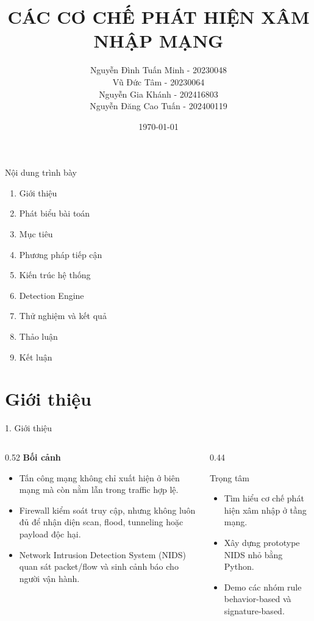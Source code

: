 \documentclass[t, aspectratio=169]{beamer}
\title{CÁC CƠ CHẾ PHÁT HIỆN XÂM NHẬP MẠNG}
\institute{Giảng viên hướng dẫn: PGS. TS. Nguyễn Linh Giang}
\author{\texorpdfstring{Nguyễn Đình Tuấn Minh - 20230048\\Vũ Đức Tâm - 20230064\\Nguyễn Gia Khánh - 202416803\\Nguyễn Đăng Cao Tuấn - 202400119}{Nhóm sinh viên}}
\date{\today}
\begin{document}
\husttitlepage

\begin{frame}{Nội dung trình bày}
    \begin{enumerate}
        \item Giới thiệu
        \item Phát biểu bài toán
        \item Mục tiêu
        \item Phương pháp tiếp cận
        \item Kiến trúc hệ thống
        \item Detection Engine
        \item Thử nghiệm và kết quả
        \item Thảo luận
        \item Kết luận
    \end{enumerate}
\end{frame}

\resetPageCount
\showPageNumber
\useStyleHustFull
\useThinBar

\section{Giới thiệu}

\begin{frame}{1. Giới thiệu}
    \begin{columns}[T,onlytextwidth]
        \begin{column}{0.52\textwidth}
            \textbf{Bối cảnh}
            \begin{itemize}
                \item Tấn công mạng không chỉ xuất hiện ở biên mạng mà còn nằm lẫn trong traffic hợp lệ.
                \item Firewall kiểm soát truy cập, nhưng không luôn đủ để nhận diện scan, flood, tunneling hoặc payload độc hại.
                \item Network Intrusion Detection System (NIDS) quan sát packet/flow và sinh cảnh báo cho người vận hành.
            \end{itemize}
        \end{column}
        \begin{column}{0.44\textwidth}
            \begin{block}{Trọng tâm}
                \begin{itemize}
                    \item Tìm hiểu cơ chế phát hiện xâm nhập ở tầng mạng.
                    \item Xây dựng prototype NIDS nhỏ bằng Python.
                    \item Demo các nhóm rule behavior-based và signature-based.
                \end{itemize}
            \end{block}
        \end{column}
    \end{columns}
\end{frame}
\end{document}
